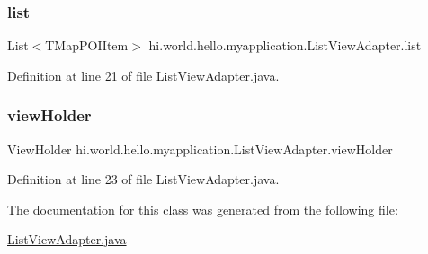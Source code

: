 \subsubsection{\texorpdfstring{list}{list}}
{\footnotesize\ttfamily List$<$T\+Map\+P\+O\+I\+Item$>$ hi.\+world.\+hello.\+myapplication.\+List\+View\+Adapter.\+list\hspace{0.3cm}{\ttfamily [private]}}



Definition at line 21 of file List\+View\+Adapter.\+java.

\mbox{\label{classhi_1_1world_1_1hello_1_1myapplication_1_1_list_view_adapter_a90d289e2054c3deb8a8c2c80abdd5ba1}} 
\subsubsection{\texorpdfstring{viewHolder}{viewHolder}}
{\footnotesize\ttfamily View\+Holder hi.\+world.\+hello.\+myapplication.\+List\+View\+Adapter.\+view\+Holder\hspace{0.3cm}{\ttfamily [private]}}



Definition at line 23 of file List\+View\+Adapter.\+java.



The documentation for this class was generated from the following file\+:\begin{DoxyCompactItemize}
\item 
\mbox{\hyperlink{_list_view_adapter_8java}{List\+View\+Adapter.\+java}}\end{DoxyCompactItemize}
